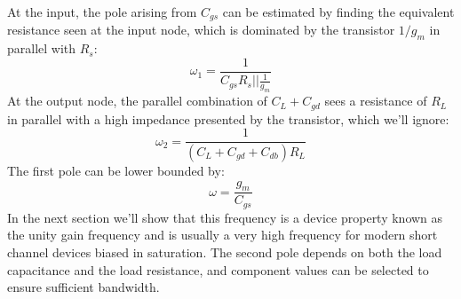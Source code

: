 At the input, the pole arising from $C_{gs}$ can be estimated by finding the equivalent resistance seen at the input node, which is dominated by the transistor $1/g_m$ in parallel with $R_s$:
%
\begin{equation}
	\omega_1 = \frac{1}{C_{gs} R_s||\frac{1}{g_m}}
\end{equation}    
%
At the output node, the parallel combination of $C_L + C_{gd}$ sees a resistance of $R_L$ in parallel with a high impedance presented by the transistor, which we'll ignore:
%
\begin{equation}
	\omega_2 = \frac{1}{(C_{L} + C_{gd} + C_{db}) R_L}
\end{equation}    
%
The first pole can be lower bounded by:
%
\begin{equation}
	\omega = \frac{g_m}{C_{gs}}
\end{equation}
%
In the next section we'll show that this frequency is a device property known as the unity gain frequency and is usually a very high frequency for modern short channel devices biased in saturation.  The second pole depends on both the load capacitance and the load resistance, and component values can be selected to ensure sufficient bandwidth.

